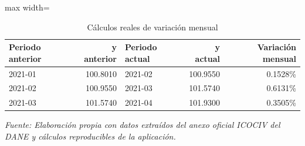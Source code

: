 \begin{table}[H]
\centering
\caption{Cálculos reales de variación mensual}
\label{tab:ejemplo_variacion_mensual_vias_urbanas}
\scriptsize
\begin{adjustbox}{max width=\linewidth}
\begin{tabular}{lrlrr}
\toprule
Periodo anterior & y anterior & Periodo actual & y actual & Variación mensual \\
\midrule
2021-01 & 100.8010 & 2021-02 & 100.9550 & 0.1528\% \\
2021-02 & 100.9550 & 2021-03 & 101.5740 & 0.6131\% \\
2021-03 & 101.5740 & 2021-04 & 101.9300 & 0.3505\% \\
\bottomrule
\end{tabular}
\end{adjustbox}
\par\footnotesize\textit{Fuente: Elaboración propia con datos extraídos del anexo oficial ICOCIV del DANE y cálculos reproducibles de la aplicación.}
\end{table}
